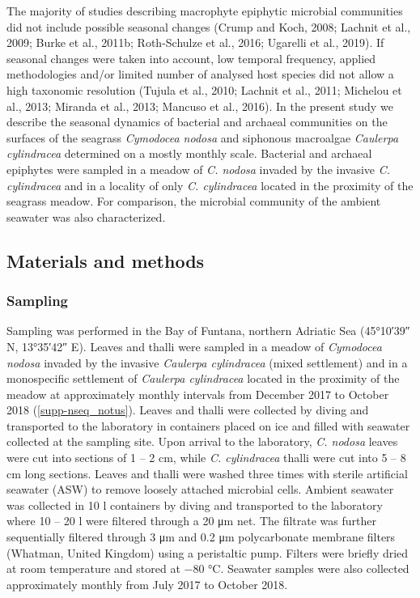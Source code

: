 \documentclass[12pt,]{article}
\begin{document}
The majority of studies describing macrophyte epiphytic microbial
communities did not include possible seasonal changes (Crump and Koch,
2008; Lachnit et al., 2009; Burke et al., 2011b; Roth-Schulze et al.,
2016; Ugarelli et al., 2019). If seasonal changes were taken into
account, low temporal frequency, applied methodologies and/or limited
number of analysed host species did not allow a high taxonomic
resolution (Tujula et al., 2010; Lachnit et al., 2011; Michelou et al.,
2013; Miranda et al., 2013; Mancuso et al., 2016). In the present study
we describe the seasonal dynamics of bacterial and archaeal communities
on the surfaces of the seagrass \emph{Cymodocea nodosa} and siphonous
macroalgae \emph{Caulerpa cylindracea} determined on a mostly monthly
scale. Bacterial and archaeal epiphytes were sampled in a meadow of
\emph{C. nodosa} invaded by the invasive \emph{C. cylindracea} and in a
locality of only \emph{C. cylindracea} located in the proximity of the
seagrass meadow. For comparison, the microbial community of the ambient
seawater was also characterized.

\newpage

\hypertarget{materials-and-methods}{%
\subsection{Materials and methods}\label{materials-and-methods}}

\hypertarget{sampling}{%
\subsubsection{Sampling}\label{sampling}}

Sampling was performed in the Bay of Funtana, northern Adriatic Sea
(\ang{45;10;39} N, \ang{13;35;42} E). Leaves and thalli were sampled in
a meadow of \emph{Cymodocea nodosa} invaded by the invasive
\emph{Caulerpa cylindracea} (mixed settlement) and in a monospecific
settlement of \emph{Caulerpa cylindracea} located in the proximity of
the meadow at approximately monthly intervals from December 2017 to
October 2018 (\autoref{supp-nseq_notus}). Leaves and thalli were
collected by diving and transported to the laboratory in containers
placed on ice and filled with seawater collected at the sampling site.
Upon arrival to the laboratory, \emph{C. nodosa} leaves were cut into
sections of 1 -- 2 \si{\cm}, while \emph{C. cylindracea} thalli were cut
into 5 -- 8 \si{\cm} long sections. Leaves and thalli were washed three
times with sterile artificial seawater (ASW) to remove loosely attached
microbial cells. Ambient seawater was collected in 10 \si{\l} containers
by diving and transported to the laboratory where 10 -- 20 \si{\l} were
filtered through a 20 \si{\um} net. The filtrate was further
sequentially filtered through 3 \si{\um} and 0.2 \si{\um} polycarbonate
membrane filters (Whatman, United Kingdom) using a peristaltic pump.
Filters were briefly dried at room temperature and stored at \num{-80}
\si{\degreeCelsius}. Seawater samples were also collected approximately
monthly from July 2017 to October 2018.
\end{document}
